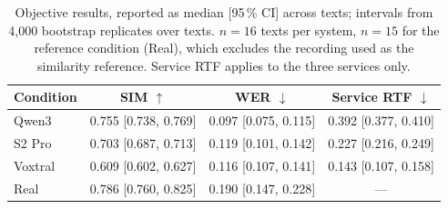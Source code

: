 \begin{table}[H]
    \centering
    \small
    \begin{tabular}{lccc}
        \toprule
        \textbf{Condition} & \textbf{SIM} $\uparrow$ & \textbf{WER} $\downarrow$ & \textbf{Service RTF} $\downarrow$ \\
        \midrule
        Qwen3 & 0.755 [0.738, 0.769] & 0.097 [0.075, 0.115] & 0.392 [0.377, 0.410] \\
        S2 Pro & 0.703 [0.687, 0.713] & 0.119 [0.101, 0.142] & 0.227 [0.216, 0.249] \\
        Voxtral & 0.609 [0.602, 0.627] & 0.116 [0.107, 0.141] & 0.143 [0.107, 0.158] \\
        \midrule
        Real & 0.786 [0.760, 0.825] & 0.190 [0.147, 0.228] & --- \\
        \bottomrule
    \end{tabular}
    \caption{Objective results, reported as median [95\,\% CI] across texts; intervals from 4,000 bootstrap replicates over texts. $n = 16$ texts per system, $n = 15$ for the reference condition (Real), which excludes the recording used as the similarity reference. Service RTF applies to the three services only.}
    \label{tab:objective_results}
\end{table}
